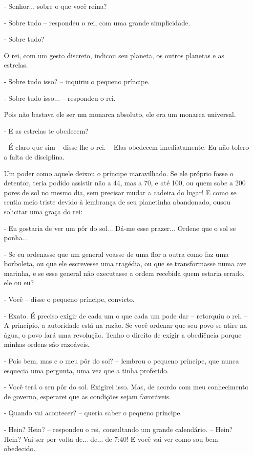 - Senhor... sobre o que você reina?

- Sobre tudo -- respondeu o rei, com uma grande simplicidade.

- Sobre tudo?

O rei, com um gesto discreto, indicou seu planeta, os outros planetas e
as estrelas.

- Sobre tudo isso? -- inquiriu o pequeno príncipe.

- Sobre tudo isso... -- respondeu o rei.

Pois não bastava ele ser um monarca absoluto, ele era um monarca
universal.

- E as estrelas te obedecem?

- É claro que sim -- disse-lhe o rei. -- Elas obedecem imediatamente. Eu
não tolero a falta de disciplina.

Um poder como aquele deixou o príncipe maravilhado. Se ele próprio fosse
o detentor, teria podido assistir não a 44, mas a 70, e até 100, ou quem
sabe a 200 pores de sol no mesmo dia, sem precisar mudar a cadeira do
lugar! E como se sentia meio triste devido à lembrança de seu planetinha
abandonado, ousou solicitar uma graça do rei:

- Eu gostaria de ver um pôr do sol... Dá-me esse prazer... Ordene que o
sol se ponha...

- Se eu ordenasse que um general voasse de uma flor a outra como faz uma
borboleta, ou que ele escrevesse uma tragédia, ou que se transformasse
numa ave marinha, e se esse general não executasse a ordem recebida quem
estaria errado, ele ou eu?

- Você -- disse o pequeno príncipe, convicto.

- Exato. É preciso exigir de cada um o que cada um pode dar -- retorquiu
o rei. -- A princípio, a autoridade está na razão. Se você ordenar que
seu povo se atire na água, o povo fará uma revolução. Tenho o direito de
exigir a obediência porque minhas ordens são razoáveis.

- Pois bem, mas e o meu pôr do sol? -- lembrou o pequeno príncipe, que
nunca esquecia uma pergunta, uma vez que a tinha proferido.

- Você terá o seu pôr do sol. Exigirei isso. Mas, de acordo com meu
conhecimento de governo, esperarei que as condições sejam favoráveis.

- Quando vai acontecer? -- queria saber o pequeno príncipe.

- Hein? Hein? -- respondeu o rei, consultando um grande calendário. --
Hein? Hein? Vai ser por volta de... de... de 7:40! E você vai ver como
sou bem obedecido.

